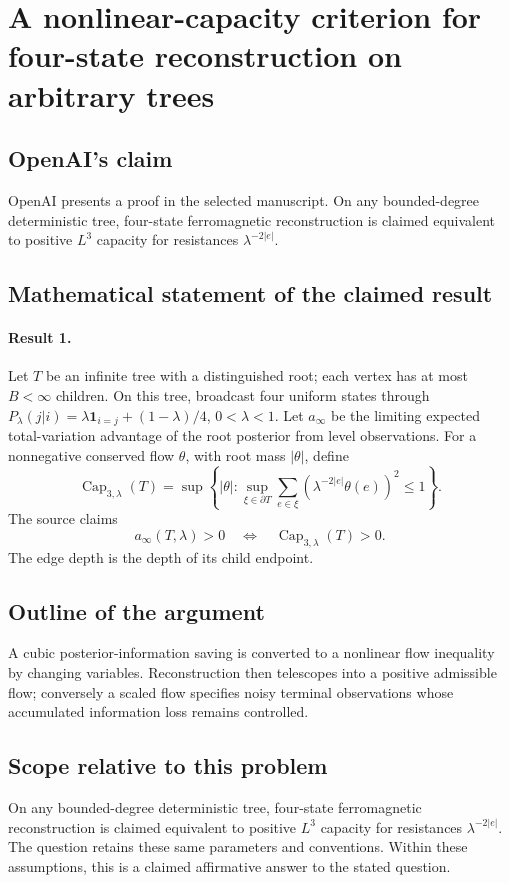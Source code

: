 \documentclass[11pt]{article}
\begin{document}
\section*{A nonlinear-capacity criterion for four-state reconstruction on arbitrary trees}

\subsection{OpenAI's claim}
OpenAI presents a proof in the selected manuscript. On any bounded-degree deterministic tree, four-state ferromagnetic reconstruction is claimed equivalent to positive $L^3$ capacity for resistances $\lambda^{-2|e|}$.

\subsection{Mathematical statement of the claimed result}
\paragraph{Result 1.} Let \(T\) be an infinite tree with a distinguished root; each vertex has at most \(B<\infty\) children. On this tree, broadcast four uniform states through \(P_\lambda(j|i)=\lambda\mathbf1_{i=j}+(1-\lambda)/4\), \(0<\lambda<1\). Let \(a_\infty\) be the limiting expected total-variation advantage of the root posterior from level observations. For a nonnegative conserved flow \(\theta\), with root mass \(|\theta|\), define
\[
 \operatorname{Cap}_{3,\lambda}(T)=\sup\left\{|\theta|:
 \sup_{\xi\in\partial T}\sum_{e\in\xi}(\lambda^{-2|e|}\theta(e))^2\le1\right\}.
\]
The source claims
\[
 a_\infty(T,\lambda)>0\quad\Longleftrightarrow\quad\operatorname{Cap}_{3,\lambda}(T)>0.
\]
The edge depth is the depth of its child endpoint.

\subsection{Outline of the argument}
A cubic posterior-information saving is converted to a nonlinear flow inequality by changing variables. Reconstruction then telescopes into a positive admissible flow; conversely a scaled flow specifies noisy terminal observations whose accumulated information loss remains controlled.

\subsection{Scope relative to this problem}
On any bounded-degree deterministic tree, four-state ferromagnetic reconstruction is claimed equivalent to positive $L^3$ capacity for resistances $\lambda^{-2|e|}$. The question retains these same parameters and conventions. Within these assumptions, this is a claimed affirmative answer to the stated question.
\end{document}
